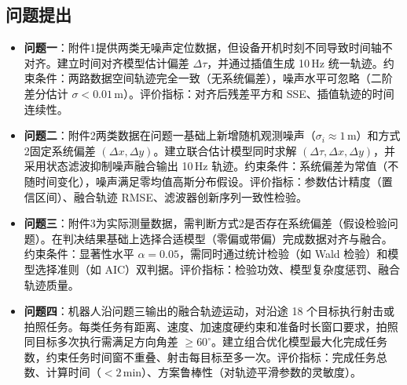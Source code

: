 \subsection{问题提出}
\begin{itemize}
    \item \textbf{问题一}：附件1提供两类无噪声定位数据，但设备开机时刻不同导致时间轴不对齐。建立时间对齐模型估计偏差 $\Delta\tau$，并通过插值生成 10\,Hz 统一轨迹。约束条件：两路数据空间轨迹完全一致（无系统偏差），噪声水平可忽略（二阶差分估计 $\sigma < 0.01$\,m）。评价指标：对齐后残差平方和 SSE、插值轨迹的时间连续性。

    \item \textbf{问题二}：附件2两类数据在问题一基础上新增随机观测噪声（$\sigma_i \approx 1$\,m）和方式2固定系统偏差 $(\Delta x, \Delta y)$。建立联合估计模型同时求解 $(\Delta\tau, \Delta x, \Delta y)$，并采用状态滤波抑制噪声融合输出 10\,Hz 轨迹。约束条件：系统偏差为常值（不随时间变化），噪声满足零均值高斯分布假设。评价指标：参数估计精度（置信区间）、融合轨迹 RMSE、滤波器创新序列一致性检验。

    \item \textbf{问题三}：附件3为实际测量数据，需判断方式2是否存在系统偏差（假设检验问题）。在判决结果基础上选择合适模型（零偏或带偏）完成数据对齐与融合。约束条件：显著性水平 $\alpha=0.05$，需同时通过统计检验（如 Wald 检验）和模型选择准则（如 AIC）双判据。评价指标：检验功效、模型复杂度惩罚、融合轨迹质量。

    \item \textbf{问题四}：机器人沿问题三输出的融合轨迹运动，对沿途 18 个目标执行射击或拍照任务。每类任务有距离、速度、加速度硬约束和准备时长窗口要求，拍照同目标多次执行需满足方向角差 $\ge 60^\circ$。建立组合优化模型最大化完成任务数，约束任务时间窗不重叠、射击每目标至多一次。评价指标：完成任务总数、计算时间（$< 2$\,min）、方案鲁棒性（对轨迹平滑参数的灵敏度）。
\end{itemize}
